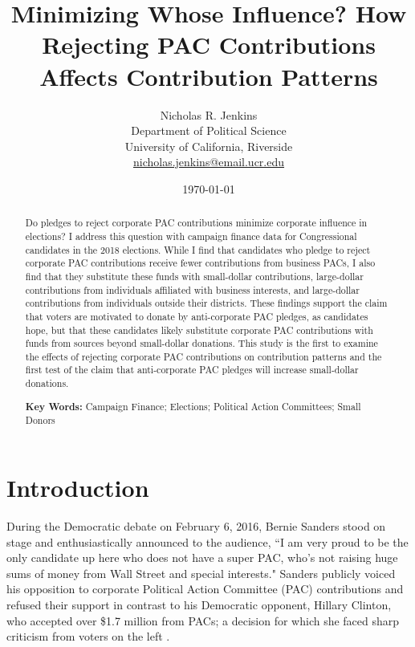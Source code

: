 \documentclass[12pt]{article}
\title{\textbf{Minimizing Whose Influence? How Rejecting PAC Contributions Affects Contribution Patterns}}
\author{Nicholas R. Jenkins \\ Department of Political Science\\ University of California, Riverside\\ \href{mailto:nicholas.jenkins@email.ucr.edu}{nicholas.jenkins@email.ucr.edu}}
\date{\today}
\begin{document}
\maketitle
\thispagestyle{empty}

\begin{abstract}

Do pledges to reject corporate PAC contributions minimize corporate influence in elections? I address this question with campaign finance data for Congressional candidates in the 2018 elections. While I find that candidates who pledge to reject corporate PAC contributions receive fewer contributions from business PACs, I also find that they substitute these funds with small-dollar contributions, large-dollar contributions from individuals affiliated with business interests, and large-dollar contributions from individuals outside their districts. These findings support the claim that voters are motivated to donate by anti-corporate PAC pledges, as candidates hope, but that these candidates likely substitute corporate PAC contributions with funds from sources beyond small-dollar donations. This study is the first to examine the effects of rejecting corporate PAC contributions on contribution patterns and the first test of the claim that anti-corporate PAC pledges will increase small-dollar donations.

\medskip

\noindent \textbf{Key Words:} Campaign Finance; Elections; Political Action Committees; Small Donors

\end{abstract}

\pagebreak

\cleardoublepage
\setcounter{page}{1}

\doublespacing

\section{Introduction} \label{sec: intro}

During the Democratic debate on February 6, 2016, Bernie Sanders stood on stage and enthusiastically announced to the audience, ``I am very proud to be the only candidate up here who does not have a super PAC, who’s not raising huge sums of money from Wall Street and special interests." Sanders publicly voiced his opposition to corporate Political Action Committee (PAC) contributions and refused their support in contrast to his Democratic opponent, Hillary Clinton, who accepted over \$1.7 million from PACs; a decision for which she faced sharp criticism from voters on the left \citep{seitz-wald2015}. 
\end{document}
